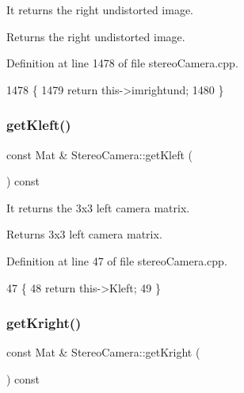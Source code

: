 It returns the right undistorted image. 

\begin{DoxyReturn}{Returns}
the right undistorted image. 
\end{DoxyReturn}


Definition at line 1478 of file stereo\+Camera.\+cpp.


\begin{DoxyCode}
1478                                              \{
1479     \textcolor{keywordflow}{return} this->imrightund;
1480 \}
\end{DoxyCode}
\mbox{\label{classStereoCamera_a932e0ebd63c3e9a93b33c1846459aadc}} 
\subsubsection{\texorpdfstring{get\+Kleft()}{getKleft()}}
{\footnotesize\ttfamily const Mat \& Stereo\+Camera\+::get\+Kleft (\begin{DoxyParamCaption}{ }\end{DoxyParamCaption}) const}



It returns the 3x3 left camera matrix. 

\begin{DoxyReturn}{Returns}
3x3 left camera matrix. 
\end{DoxyReturn}


Definition at line 47 of file stereo\+Camera.\+cpp.


\begin{DoxyCode}
47                                         \{
48     \textcolor{keywordflow}{return} this->Kleft;
49 \}
\end{DoxyCode}
\mbox{\label{classStereoCamera_a6f9e53e949b77cd19e28a4ec92034a3d}} 
\subsubsection{\texorpdfstring{get\+Kright()}{getKright()}}
{\footnotesize\ttfamily const Mat \& Stereo\+Camera\+::get\+Kright (\begin{DoxyParamCaption}{ }\end{DoxyParamCaption}) const}



